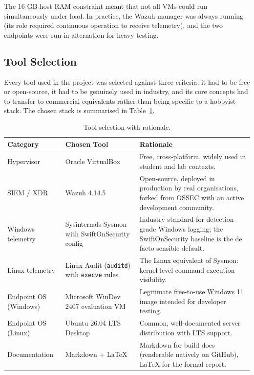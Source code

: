 The 16 GB host RAM constraint meant that not all VMs could run
simultaneously under load. In practice, the Wazuh manager was always
running (its role required continuous operation to receive telemetry), and
the two endpoints were run in alternation for heavy testing.

\subsection{Tool Selection}
\label{sec:tools}

Every tool used in the project was selected against three criteria: it had to
be free or open-source, it had to be genuinely used in industry, and its
core concepts had to transfer to commercial equivalents rather than being
specific to a hobbyist stack. The chosen stack is summarised in
Table~\ref{tab:toolselection}.

\begin{table}[h!]
\centering
\small
\begin{tabular}{p{3.5cm} p{4.5cm} p{6cm}}
\toprule
\textbf{Category} & \textbf{Chosen Tool} & \textbf{Rationale} \\
\midrule
Hypervisor & Oracle VirtualBox & Free, cross-platform, widely used in student and lab contexts. \\
SIEM / XDR & Wazuh 4.14.5 & Open-source, deployed in production by real organisations, forked from OSSEC with an active development community. \\
Windows telemetry & Sysinternals Sysmon with SwiftOnSecurity config & Industry standard for detection-grade Windows logging; the SwiftOnSecurity baseline is the de facto sensible default. \\
Linux telemetry & Linux Audit (\texttt{auditd}) with \texttt{execve} rules & The Linux equivalent of Sysmon: kernel-level command execution visibility. \\
Endpoint OS (Windows) & Microsoft WinDev 2407 evaluation VM & Legitimate free-to-use Windows 11 image intended for developer testing. \\
Endpoint OS (Linux) & Ubuntu 26.04 LTS Desktop & Common, well-documented server distribution with LTS support. \\
Documentation & Markdown + LaTeX & Markdown for build docs (renderable natively on GitHub), LaTeX for the formal report. \\
\bottomrule
\end{tabular}
\caption{Tool selection with rationale.}
\label{tab:toolselection}
\end{table}

